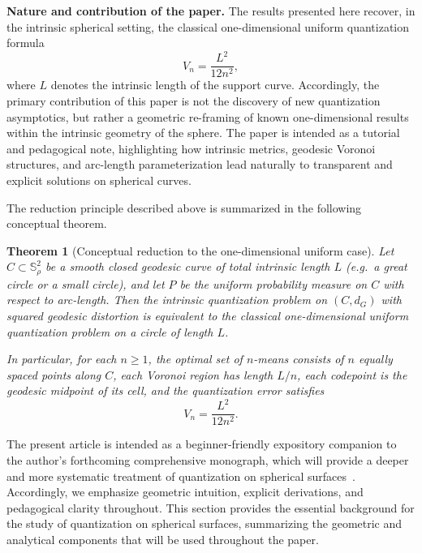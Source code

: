 \documentclass[12pt, reqno]{amsart}
\theoremstyle{plain}
\newtheorem{theorem}[subsection]{Theorem}
\theoremstyle{definition}
\newcommand{\D}[1]{\mathbb{#1}}%
\begin{document}
\medskip
\noindent\textbf{Nature and contribution of the paper.}
The results presented here recover, in the intrinsic spherical setting, the classical
one-dimensional uniform quantization formula
\[
V_n = \frac{L^2}{12n^2},
\]
where $L$ denotes the intrinsic length of the support curve. Accordingly, the primary
contribution of this paper is not the discovery of new quantization asymptotics, but
rather a geometric re-framing of known one-dimensional results within the intrinsic
geometry of the sphere. The paper is intended as a tutorial and pedagogical note,
highlighting how intrinsic metrics, geodesic Voronoi structures, and arc-length
parameterization lead naturally to transparent and explicit solutions on spherical
curves.

\medskip
\noindent
The reduction principle described above is summarized in the following conceptual
theorem.


\begin{theorem}[Conceptual reduction to the one-dimensional uniform case]
Let $C \subset \D S^2_\rho$ be a smooth closed geodesic curve of total intrinsic length $L$
(e.g.\ a great circle or a small circle), and let $P$ be the uniform probability measure
on $C$ with respect to arc-length. Then the intrinsic quantization problem on $(C,d_G)$
with squared geodesic distortion is equivalent to the classical one-dimensional uniform
quantization problem on a circle of length $L$.

In particular, for each $n \ge 1$, the optimal set of $n$-means consists of $n$ equally
spaced points along $C$, each Voronoi region has length $L/n$, each codepoint is the
geodesic midpoint of its cell, and the quantization error satisfies
\[
V_n = \frac{L^2}{12n^2}.
\]
\end{theorem}


The present article is intended as a beginner-friendly expository companion to the
author’s forthcoming comprehensive monograph, which will provide a deeper and more
systematic treatment of quantization on spherical surfaces~\cite{Roychowdhury2025}.
Accordingly, we emphasize geometric intuition, explicit derivations, and pedagogical
clarity throughout. This section provides the essential background for the study of
quantization on spherical surfaces, summarizing the geometric and analytical components
that will be used throughout the paper.
\end{document}
